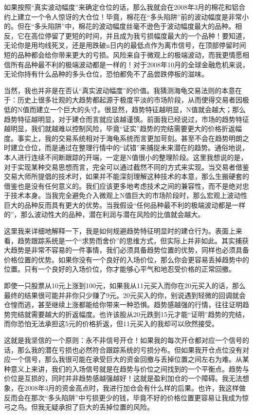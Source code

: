 如果按照“真实波动幅度”来确定仓位的话，那么我就会在2008年3月的棉花和铝合约上建立一个令人惊讶的大仓位！毕竟，棉花在“多头陷阱”前的波动幅度是非常小的。但在“多头陷阱”中，棉花的波动幅度丝毫不逊色于波动幅度最大的品种。相反，它在高位停留了更短的时间，并且成为我亏损幅度最大的一个品种！要知道，无论你是用均线死叉，还是用跌破n日内的最低点作为离市信号，在顶部停留时间短的品种都会给你带来更大的亏损。风险来自于微观上的极端波动，而我更情愿相信所有品种最不利的极端波动都是一样的！对于2008年10月的全球金融危机来说，无论你持有什么品种的多头仓位，恐怕都免不了品尝跌停板的滋味。

当然，我也并非是在否认“真实波动幅度”的价值。我猜测海龟交易法则的本意在于：历史上很多壮观的大趋势都起源于极度平淡的市场阶段，从而使得交易者因极低的N值而建立一个巨大的头寸。很显然，趋势特征越明显，N值就会越大；那么趋势特征越明显，对于建仓而言就应该越谨慎。前面我已经说过，市场的趋势特征越明显，我们就越难以控制风险，毕竟“证实”趋势的完结需要更大的价格折返幅度。事实上，我的交易系统相对于海龟系统而言更加苛刻。甚至不会在趋势明朗之时建立仓位，而是通过在整理行情中的“试错”来捕捉未来潜在的趋势。通俗地说，本人进行连续不间断跟踪的开端，一定是N值很小的整理阶段。这里我想说的是，对于实现某种交易思想而言，完全可以通过截然不同的方式来实现。当交易者借鉴交易大师所提倡的技术时，如果并不能深刻理解这种技术的本意，那么生搬硬套的借鉴也是没有任何意义的。我们应该更多地考虑技术之间的兼容性，而不是绝对忠于技术本身。当我完全避免介入微观上N值巨大的市场阶段时，那么宏观上波动性巨大的品种反而具有更大的优势。当我假设“任何品种最不利的极端波动都是一样的”，那么波动性大的品种，潜在利润与潜在风险的比值就会越大。

这里我来详细地解释一下，我是如何规避趋势特征明显时的建仓行为。表面上来看，趋势跟踪系统是一个“求势而舍价”的思维方式，但实际上并非如此。其实捕获大趋势是非常不容易的一件事情，我们必须具备趋势位置的优势，同样也必须具备价格位置的优势。如果你没有一个良好的入场价位，那么你会更容易丢掉趋势中的位置。只有一个良好的入场价位，你才能够心平气和地忍受价格的正常回撤。

即使一只股票从10元上涨到100元，如果我从11元买入而你在20元买入的话，那么最终的结果很可能并非你只少赚了9元。20元买入的你，别说遇到轻微的回调就会仓惶而逃，甚至继续上涨都能给你带来一种恐惧。趋势感越强的行情，往往证明趋势完结就需要越大的折返幅度。也许该股从20元跌到15元才能“证明”趋势的完结，而你恐怕无法承担这5元的价格折返，但11元买入的我却可以欣然接受。

这就是我坚信的一个原则：永不非信号开仓！如果我的每次开仓都对应一个信号的话，那么我的潜在亏损也必然符合跟踪系统的亏损分布。但如果我开仓点位没有对应一个信号，那么我很可能在承受巨大的资金回撤与丢掉位置之间左右为难。从某种意义上来讲，我们的入场信号就是在趋势与价位之间找到的一个平衡点。趋势与价位是互损的，同时并非趋势感越强越好！这就是盈利加仓的一个障碍。我无法想象，在2008年3月的资金高点时，我进行加仓会有什么样的后果。也许，我这样做反而会在那次“多头陷阱”中亏损更少的钱，毕竟不好的价格位置更容易让我成为惊弓之鸟。但我无疑承担了巨大的丢掉位置的风险。

